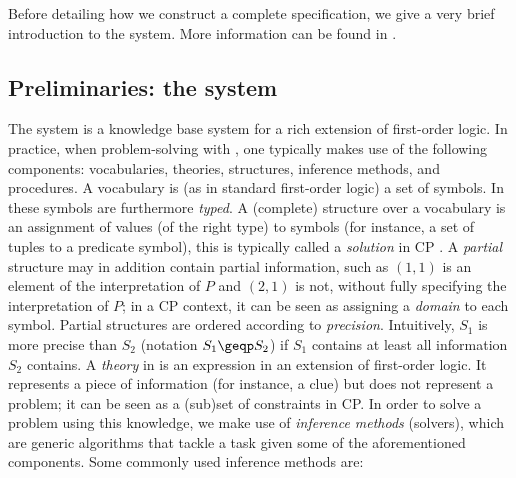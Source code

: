 Before detailing how we construct a complete specification, we give a very brief introduction to the \idp system. More information can be found in . 
\subsection{Preliminaries: the \idp system} 
The \idp system  is a knowledge base system  for a rich extension of first-order logic. 
In practice, when problem-solving with \idp, one typically makes use of the following components: vocabularies, theories, structures, inference methods, and procedures.
A vocabulary is (as in standard first-order logic) a set of symbols. In \idp these symbols are furthermore \emph{typed}. 
A (complete) structure over a vocabulary is an assignment of values (of the right type) to symbols (for instance, a set of tuples to a predicate symbol), this is typically called a \textit{solution} in CP . A \emph{partial} structure may in addition contain partial information, such as $(1,1)$ is an element of the interpretation of $P$ and $(2,1)$ is not, without fully specifying the interpretation of $P$; in a CP context, it can be seen as assigning a \textit{domain} to each symbol. 
Partial structures are ordered according to \emph{precision}. Intuitively, $S_1$ is more precise than $S_2$ (notation $S_1\geqp S_2$) if $S_1$ contains at least all information $S_2$ contains. 
A \emph{theory} in \idp is an expression in an extension of first-order logic. It represents a piece of information (for instance, a clue) but does not represent a problem; it can be seen as a (sub)set of constraints in CP. 
In order to solve a problem using this knowledge, we make use of \emph{inference methods} (solvers), which are generic algorithms that tackle a task given some of the aforementioned components. Some commonly used inference methods are:
